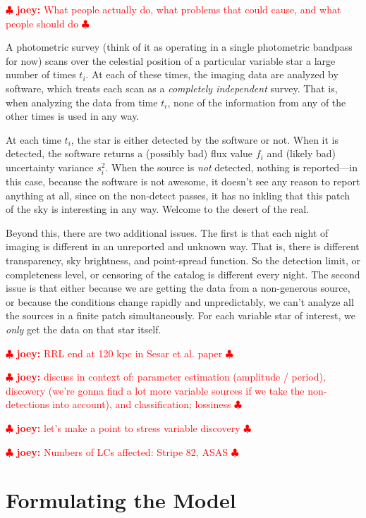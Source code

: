 \documentclass[12pt,preprint]{aastex}
\newcommand{\joey}[1] { \textcolor{red} {
\ensuremath{\clubsuit} {\bf joey:}  {#1}
\ensuremath{\clubsuit} } }%
\begin{document}
\joey{What people actually do, what problems that could cause, and what people should do}

A photometric survey (think of it as operating in a single photometric
bandpass for now) scans over the celestial position of a particular
variable star  a large number of times $t_i$.  At each of these
times, the imaging data are analyzed by software, which
treats each scan as a \emph{completely independent} survey.  That is,
when analyzing the data from time $t_i$, none of the information from
any of the other times is used in any way.




At each time $t_i$, the star is either detected by the
software or not.  When it is detected, the software returns
a (possibly bad) flux value $f_i$ and (likely bad) uncertainty
variance $s_i^2$.  When the source is \emph{not} detected,
nothing is reported---in this case, because the software is not
awesome, it doesn't see any reason to report anything at all, since on
the non-detect passes, it has no inkling that this patch of the sky is
interesting in any way.  Welcome to the desert of the real.

Beyond this, there are two additional issues.  The first is that each
night of imaging is different in an unreported and unknown way.  That
is, there is different transparency, sky brightness, and point-spread
function.  So the detection limit, or completeness level, or censoring
of the catalog is different every night.  The second issue is that
either because we are getting the data from a non-generous source, or
because the conditions change rapidly and unpredictably, we can't
analyze all the sources in a finite patch simultaneously.  For each
variable star of interest, we \emph{only} get the data on that star
itself.

\joey{RRL end at 120 kpc in Sesar et al. paper}

\joey{discuss in context of: parameter estimation (amplitude / period), discovery (we're gonna find a lot more variable sources if we take the non-detections into account), and classification; lossiness}

\joey{let's make a point to stress variable discovery}

\joey{Numbers of LCs affected: Stripe 82, ASAS}




\section{Formulating the Model}
\label{sec:model}
\end{document}
